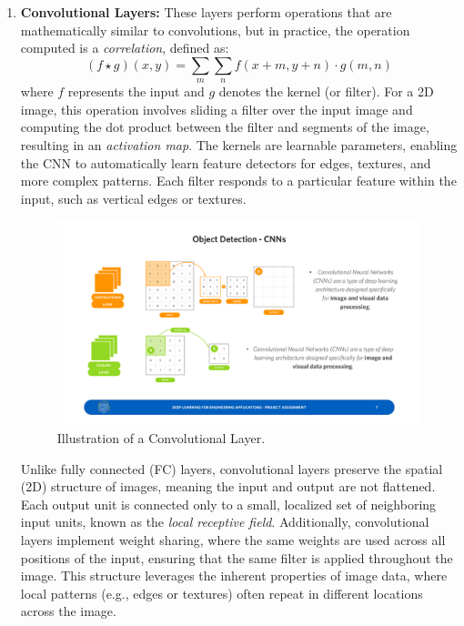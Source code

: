 \begin{enumerate}
    \item \textbf{Convolutional Layers:} These layers perform operations that are mathematically similar to convolutions, but in practice, the operation computed is a \textit{correlation}, defined as:
    \begin{equation}
        (f \star g)(x, y) = \sum_{m}\sum_{n}f(x + m, y + n) \cdot g(m, n)
    \end{equation}
    where \( f \) represents the input and \( g \) denotes the kernel (or filter). For a 2D image, this operation involves sliding a filter over the input image and computing the dot product between the filter and segments of the image, resulting in an \textit{activation map}. The kernels are learnable parameters, enabling the CNN to automatically learn feature detectors for edges, textures, and more complex patterns. Each filter responds to a particular feature within the input, such as vertical edges or textures.

    \begin{figure}[H]
        \centering
        \includegraphics[width=1\linewidth]{LateX//figs/CCN_layer.pdf}
        \caption{Illustration of a Convolutional Layer.}
        \label{fig:cnn-layer}
    \end{figure}

    Unlike fully connected (FC) layers, convolutional layers preserve the spatial (2D) structure of images, meaning the input and output are not flattened. Each output unit is connected only to a small, localized set of neighboring input units, known as the \textit{local receptive field}. Additionally, convolutional layers implement weight sharing, where the same weights are used across all positions of the input, ensuring that the same filter is applied throughout the image. This structure leverages the inherent properties of image data, where local patterns (e.g., edges or textures) often repeat in different locations across the image.


\end{enumerate}
